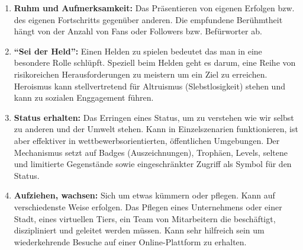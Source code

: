\documentclass[a4paper,12pt]{scrartcl}
\begin{document}
\begin{description}
\begin{enumerate}
      \item \textbf{Ruhm und Aufmerksamkeit:} Das Präsentieren von eigenen Erfolgen bzw. des eigenen Fortschritts gegenüber anderen. Die empfundene Berühmtheit hängt von der Anzahl von Fans oder Followers bzw. Befürworter ab.
      \item \textbf{\enquote{Sei der Held}:} Einen Helden zu spielen bedeutet das man in eine besondere Rolle schlüpft. Speziell beim Helden geht es darum, eine Reihe von risikoreichen Herausforderungen zu meistern um ein Ziel zu erreichen. Heroismus kann stellvertretend für Altruismus (Slebstlosigkeit) stehen und kann zu sozialen Enggagement führen.
      \item \textbf{Status erhalten:} Das Erringen eines Status, um zu verstehen wie wir selbst zu anderen und der Umwelt stehen. Kann in Einzelszenarien funktionieren, ist aber effektiver in wettbewerbsorientierten, öffentlichen Umgebungen. Der Mechanismus setzt auf Badges (Auszeichnungen), Trophäen, Levels, seltene und limitierte Gegenstände sowie eingeschränkter Zugriff als Symbol für den Status.
      \item \textbf{Aufziehen, wachsen:} Sich um etwas kümmern oder pflegen. Kann auf verschiedenste Weise erfolgen. Das Pflegen eines Unternehmens oder einer Stadt, eines virtuellen Tiers, ein Team von Mitarbeitern die beschäftigt, diszipliniert und geleitet werden müssen. Kann sehr hilfreich sein um wiederkehrende Besuche auf einer Online-Plattform zu erhalten.
   \end{enumerate}
\end{description}










 























  
\newpage
\listoftables
\listoffigures
\newpage

\end{document}
